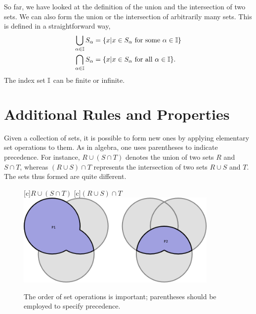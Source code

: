 So far, we have looked at the definition of the union and the intersection of two sets.
We can also form the union or the intersection of arbitrarily many sets.
This is defined in a straightforward way,
\begin{align*}
\bigcup_{\alpha \in \mathbb{I}} S_{\alpha}
&= \{ x | x \in S_{\alpha} \text{ for some } \alpha \in \mathbb{I} \} \\
\bigcap_{\alpha \in \mathbb{I}} S_{\alpha}
&= \{ x | x \in S_{\alpha} \text{ for all } \alpha \in \mathbb{I} \} .
\end{align*}
The index set $\mathbb{I}$ can be finite or infinite.


\section{Additional Rules and Properties}

Given a collection of sets, it is possible to form new ones by applying elementary set operations to them.
As in algebra, one uses parentheses to indicate precedence.
For instance, $R \cup (S \cap T)$ denotes the union of two sets $R$ and $S \cap T$, whereas $(R \cup S) \cap T$ represents the intersection of two sets $R \cup S$ and $T$.
The sets thus formed are quite different.

\begin{figure}[htb]
\begin{center}
\begin{psfrags}
[c]{$R \cup (S \cap T)$}
[c]{$(R \cup S) \cap T$}
\includegraphics[height=4.55cm]{Figures/1Chapter/triple}
\end{psfrags}
\caption{The order of set operations is important; parentheses should be employed to specify precedence.}
\end{center}
\end{figure}


